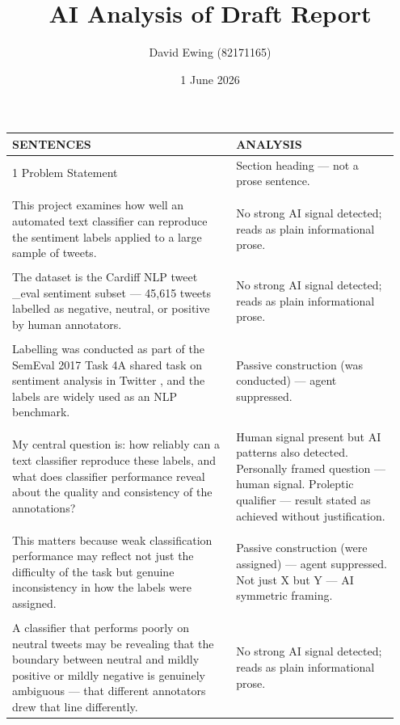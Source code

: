 \documentclass[11pt]{article}
\title{AI Analysis of Draft Report}
\author{David Ewing (82171165)}
\date{1 June 2026}
\begin{document}
\maketitle
\thispagestyle{empty}
\newpage

\setlength{\LTleft}{0pt}
\setlength{\LTright}{0pt}
\begin{longtable}{|p{0.55\linewidth}|p{0.40\linewidth}|}
\hline
\centering\textbf{SENTENCES} & \centering\textbf{ANALYSIS} \tabularnewline[2pt]
\hline
\endhead
1 Problem Statement & Section heading --- not a prose sentence. \\[2pt]
\hline
\rule{0pt}{3.5cm} & \\
\hline
This project examines how well an automated text classifier can reproduce the sentiment labels applied to a large sample of tweets. & No strong AI signal detected; reads as plain informational prose. \\[2pt]
\hline
\rule{0pt}{3.5cm} & \\
\hline
The dataset is the Cardiff NLP tweet \_eval sentiment subset --- 45,615 tweets labelled as negative, neutral, or positive by human annotators. & No strong AI signal detected; reads as plain informational prose. \\[2pt]
\hline
\rule{0pt}{3.5cm} & \\
\hline
Labelling was conducted as part of the SemEval 2017 Task 4A shared task on sentiment analysis in Twitter , and the labels are widely used as an NLP benchmark. & Passive construction (was conducted) --- agent suppressed. \\[2pt]
\hline
\rule{0pt}{3.5cm} & \\
\hline
My central question is: how reliably can a text classifier reproduce these labels, and what does classifier performance reveal about the quality and consistency of the annotations? & Human signal present but AI patterns also detected. Personally framed question --- human signal. Proleptic qualifier --- result stated as achieved without justification. \\[2pt]
\hline
\rule{0pt}{3.5cm} & \\
\hline
This matters because weak classification performance may reflect not just the difficulty of the task but genuine inconsistency in how the labels were assigned. & Passive construction (were assigned) --- agent suppressed. Not just X but Y --- AI symmetric framing. \\[2pt]
\hline
\rule{0pt}{3.5cm} & \\
\hline
A classifier that performs poorly on neutral tweets may be revealing that the boundary between neutral and mildly positive or mildly negative is genuinely ambiguous --- that different annotators drew that line differently. & No strong AI signal detected; reads as plain informational prose. \\[2pt]

\end{longtable}
\end{document}
